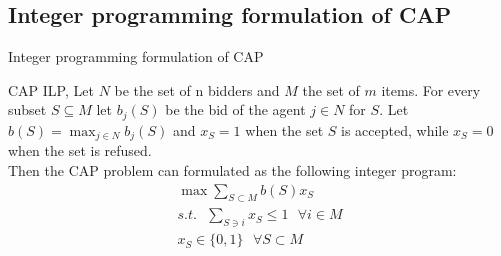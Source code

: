 \documentclass[aspectratio=169,xcolor=dvipsnames]{beamer}
\begin{document}
    \subsection{Integer programming formulation of CAP}
    \begin{frame}{Integer programming formulation of CAP}
        \begin{block}{CAP ILP, \cite{cap_survey}}
        Let $N$ be the set of n bidders and $M$ the set of $m$ items. For every subset $S \subseteq M$ let $b_j(S)$ be the bid of the agent $j \in N$ for $S$. Let $b(S)= \max_{j \in N}b_j(S)$ and $x_S = 1$ when the set $S$ is accepted, while $x_S = 0$ when the  set is refused.\\
\pause
        Then the CAP problem can formulated as the following integer program:
        \begin{gather*}
            \max \sum _{S\subset M} b(S)x_S \\
            s.t. \hspace{8pt} \sum _{S \ni i} x_S \leq 1 \hspace{8pt} \forall i \in M \\ 
            x_S \in \{0,1\} \hspace{8pt} \forall S\subset M
        \end{gather*}
        \end{block}
    \end{frame}
\end{document}
